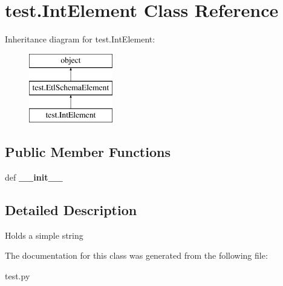 \hypertarget{classtest_1_1IntElement}{\section{test.\-Int\-Element Class Reference}
\label{classtest_1_1IntElement}
}
Inheritance diagram for test.\-Int\-Element\-:\begin{figure}[H]
\begin{center}
\leavevmode
\includegraphics[height=3.000000cm]{classtest_1_1IntElement}
\end{center}
\end{figure}
\subsection*{Public Member Functions}
\begin{DoxyCompactItemize}
\item 
\hypertarget{classtest_1_1IntElement_a7510f0d53b8b7b98a12f6f2a000018b6}{def {\bfseries \-\_\-\-\_\-init\-\_\-\-\_\-}}\label{classtest_1_1IntElement_a7510f0d53b8b7b98a12f6f2a000018b6}

\end{DoxyCompactItemize}


\subsection{Detailed Description}
\begin{DoxyVerb}Holds a simple string\end{DoxyVerb}
 

The documentation for this class was generated from the following file\-:\begin{DoxyCompactItemize}
\item 
test.\-py\end{DoxyCompactItemize}
